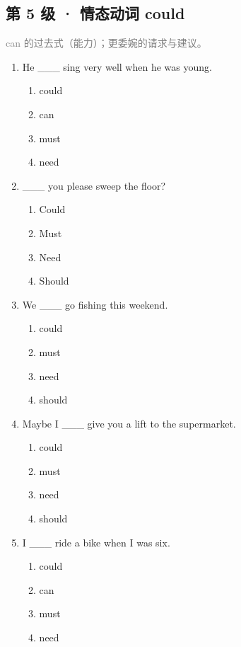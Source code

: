 \documentclass[11pt,a4paper]{ctexart}
\begin{document}
\subsection*{第 5 级 · 情态动词 could}
\noindent\textcolor{gray}{can 的过去式（能力）；更委婉的请求与建议。}\par\smallskip
\begin{enumerate}[leftmargin=*,itemsep=4pt]
\item He \_\_\_ sing very well when he was young.
\begin{enumerate}[label=\Alph*.,leftmargin=2em,itemsep=1pt,topsep=2pt]
\item could
\item can
\item must
\item need
\end{enumerate}
\item \_\_\_ you please sweep the floor?
\begin{enumerate}[label=\Alph*.,leftmargin=2em,itemsep=1pt,topsep=2pt]
\item Could
\item Must
\item Need
\item Should
\end{enumerate}
\item We \_\_\_ go fishing this weekend.
\begin{enumerate}[label=\Alph*.,leftmargin=2em,itemsep=1pt,topsep=2pt]
\item could
\item must
\item need
\item should
\end{enumerate}
\item Maybe I \_\_\_ give you a lift to the supermarket.
\begin{enumerate}[label=\Alph*.,leftmargin=2em,itemsep=1pt,topsep=2pt]
\item could
\item must
\item need
\item should
\end{enumerate}
\item I \_\_\_ ride a bike when I was six.
\begin{enumerate}[label=\Alph*.,leftmargin=2em,itemsep=1pt,topsep=2pt]
\item could
\item can
\item must
\item need

\end{enumerate}
\end{enumerate}
\end{document}
